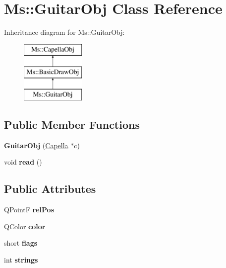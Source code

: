 \hypertarget{class_ms_1_1_guitar_obj}{}\section{Ms\+:\+:Guitar\+Obj Class Reference}
\label{class_ms_1_1_guitar_obj}
Inheritance diagram for Ms\+:\+:Guitar\+Obj\+:\begin{figure}[H]
\begin{center}
\leavevmode
\includegraphics[height=3.000000cm]{class_ms_1_1_guitar_obj}
\end{center}
\end{figure}
\subsection*{Public Member Functions}
\begin{DoxyCompactItemize}
\item 
\mbox{\label{class_ms_1_1_guitar_obj_a9bd05b31c39b51978415ec0b9a22057f}} 
{\bfseries Guitar\+Obj} (\hyperlink{class_ms_1_1_capella}{Capella} $\ast$c)
\item 
\mbox{\label{class_ms_1_1_guitar_obj_ab16cafc8856bce74861d878ff1eb3400}} 
void {\bfseries read} ()
\end{DoxyCompactItemize}
\subsection*{Public Attributes}
\begin{DoxyCompactItemize}
\item 
\mbox{\label{class_ms_1_1_guitar_obj_adcbea24257aaa4bc713b6e96a6afc01c}} 
Q\+PointF {\bfseries rel\+Pos}
\item 
\mbox{\label{class_ms_1_1_guitar_obj_ab6a95063465e9966d00d769c51ae4f56}} 
Q\+Color {\bfseries color}
\item 
\mbox{\label{class_ms_1_1_guitar_obj_a7a1d81291eb37e36ac2e68290b871e49}} 
short {\bfseries flags}
\item 
\mbox{\label{class_ms_1_1_guitar_obj_a704729d0f1efbaf463c63dfa807c724d}} 
int {\bfseries strings}
\end{DoxyCompactItemize}
